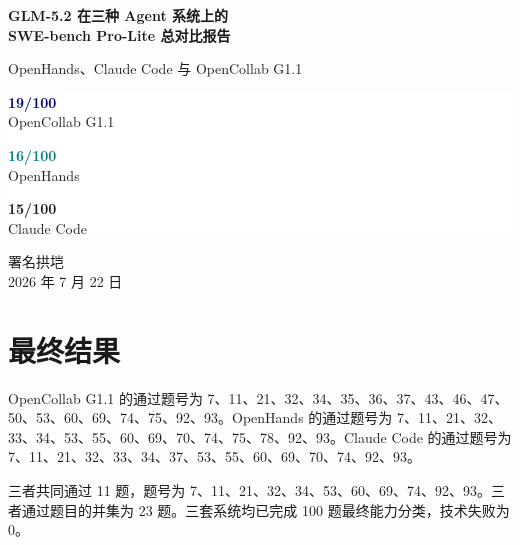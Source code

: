 \documentclass[11pt,a4paper,fontset=fandol]{ctexart}
\newcommand{\metric}[3]{%
  \begin{minipage}[c][2.15cm][c]{0.285\textwidth}
  \centering
  \textcolor{#3}{\fontsize{24}{27}\selectfont\textbf{#1}}\\[-0.05em]
  \small #2
  \end{minipage}}
\begin{document}
\begin{titlepage}
\pagecolor{lightblue}
\color{navy}
\vspace*{2.2cm}
\begin{center}
{\fontsize{29}{35}\selectfont\bfseries GLM-5.2 在三种 Agent 系统上的\\[0.22em]SWE-bench Pro-Lite 总对比报告}

\vspace{0.8cm}
{\Large OpenHands、Claude Code 与 OpenCollab G1.1}

\vspace{1.3cm}

\vspace{1.2cm}
\colorbox{white}{\begin{minipage}{0.91\textwidth}
\centering
\metric{19/100}{OpenCollab G1.1}{navy}
\metric{16/100}{OpenHands}{teal}
\metric{15/100}{Claude Code}{amber}
\end{minipage}}

\vfill
{\large 署名\quad 拱垲}\\[0.4em]
{\large 2026 年 7 月 22 日}
\end{center}
\end{titlepage}
\nopagecolor

\begin{abstract}
本报告统一比较 GLM-5.2 在 OpenHands、Claude Code 与 OpenCollab G1.1 三种 Agent 系统上的 SWE-bench Pro-Lite 结果。OpenCollab G1.1 完整评测 100 题并通过 19 题，OpenHands 完整评测 100 题并通过 16 题，Claude Code 完整评测 100 题并通过 15 题。三者共同通过 11 题，三者通过并集为 23 题。报告给出完整百题对比、交并差集合、关键失败机制和 100 题逐题矩阵。
\end{abstract}

\tableofcontents
\newpage

\section{最终结果}

OpenCollab G1.1 的通过题号为 7、11、21、32、34、35、36、37、43、46、47、50、53、60、69、74、75、92、93。OpenHands 的通过题号为 7、11、21、32、33、34、53、55、60、69、70、74、75、78、92、93。Claude Code 的通过题号为 7、11、21、32、33、34、37、53、55、60、69、70、74、92、93。

三者共同通过 11 题，题号为 7、11、21、32、34、53、60、69、74、92、93。三者通过题目的并集为 23 题。三套系统均已完成 100 题最终能力分类，技术失败为 0。
\end{document}
